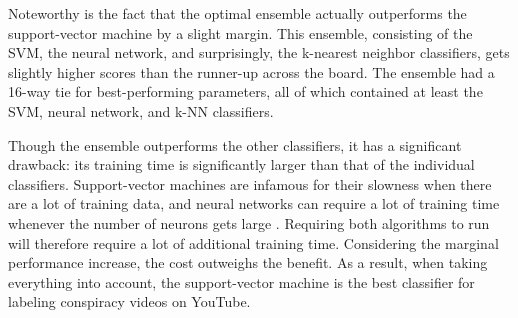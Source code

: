 \documentclass[../main.tex]{subfiles}
\begin{document}
Noteworthy is the fact that the optimal ensemble actually outperforms the support-vector machine by a slight margin. This ensemble, consisting of the SVM, the neural network, and surprisingly, the k-nearest neighbor classifiers, gets slightly higher scores than the runner-up across the board. The ensemble had a 16-way tie for best-performing parameters, all of which contained at least the SVM, neural network, and k-NN classifiers. 

Though the ensemble outperforms the other classifiers, it has a significant drawback: its training time is significantly larger than that of the individual classifiers. Support-vector machines are infamous for their slowness when there are a lot of training data, and neural networks can require a lot of training time whenever the number of neurons gets large \citep{burges1997improving, kamarthi1999accelerating}. Requiring both algorithms to run will therefore require a lot of additional training time. Considering the marginal performance increase, the cost outweighs the benefit. As a result, when taking everything into account, the support-vector machine is the best classifier for labeling conspiracy videos on YouTube.  
\end{document}
